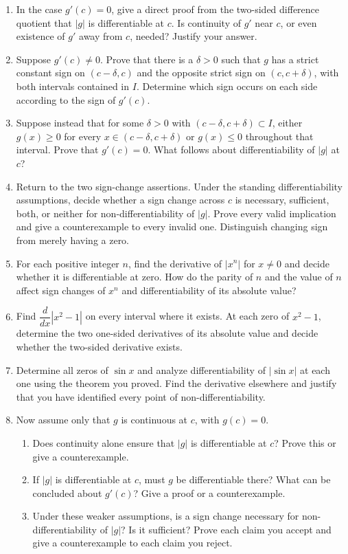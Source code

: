 \documentclass{self-check}
\begin{document}
\begin{enumerate}[resume]
\item In the case $g'(c)=0$, give a direct proof from the two-sided difference quotient that $|g|$ is differentiable at $c$. Is continuity of $g'$ near $c$, or even existence of $g'$ away from $c$, needed? Justify your answer.
\item Suppose $g'(c)\ne0$. Prove that there is a $\delta>0$ such that $g$ has a strict constant sign on $(c-\delta,c)$ and the opposite strict sign on $(c,c+\delta)$, with both intervals contained in $I$. Determine which sign occurs on each side according to the sign of $g'(c)$.
\item Suppose instead that for some $\delta>0$ with $(c-\delta,c+\delta)\subset I$, either $g(x)\ge0$ for every $x\in(c-\delta,c+\delta)$ or $g(x)\le0$ throughout that interval. Prove that $g'(c)=0$. What follows about differentiability of $|g|$ at $c$?
\item Return to the two sign-change assertions. Under the standing differentiability assumptions, decide whether a sign change across $c$ is necessary, sufficient, both, or neither for non-differentiability of $|g|$. Prove every valid implication and give a counterexample to every invalid one. Distinguish changing sign from merely having a zero.
\item For each positive integer $n$, find the derivative of $|x^n|$ for $x\ne0$ and decide whether it is differentiable at zero. How do the parity of $n$ and the value of $n$ affect sign changes of $x^n$ and differentiability of its absolute value?
\item Find $\dfrac{d}{dx}|x^2-1|$ on every interval where it exists. At each zero of $x^2-1$, determine the two one-sided derivatives of its absolute value and decide whether the two-sided derivative exists.
\item Determine all zeros of $\sin x$ and analyze differentiability of $|\sin x|$ at each one using the theorem you proved. Find the derivative elsewhere and justify that you have identified every point of non-differentiability.
\item Now assume only that $g$ is continuous at $c$, with $g(c)=0$.
\begin{enumerate}[label=(\alph*)]
\item Does continuity alone ensure that $|g|$ is differentiable at $c$? Prove this or give a counterexample.
\item If $|g|$ is differentiable at $c$, must $g$ be differentiable there? What can be concluded about $g'(c)$? Give a proof or a counterexample.
\item Under these weaker assumptions, is a sign change necessary for non-differentiability of $|g|$? Is it sufficient? Prove each claim you accept and give a counterexample to each claim you reject.

\end{enumerate}
\end{enumerate}
\end{document}
